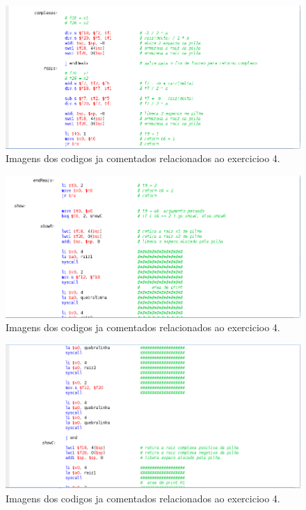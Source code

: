 \documentclass[12pt]{article}
\begin{document}
\begin{figure}[H]
	\centering
	\includegraphics[width=1\textwidth]{EX_4_7.png}
	\caption{Imagens dos codigos ja comentados relacionados ao exercicioo 4.}
	\label{fig:hilo}
\end{figure}

\begin{figure}[H]
	\centering
	\includegraphics[width=1\textwidth]{EX_4_8.png}
	\caption{Imagens dos codigos ja comentados relacionados ao exercicioo 4.}
	\label{fig:hilo}
\end{figure}

\begin{figure}[H]
	\centering
	\includegraphics[width=1\textwidth]{EX_4_9.png}
	\caption{Imagens dos codigos ja comentados relacionados ao exercicioo 4.}
	\label{fig:hilo}
\end{figure}
\end{document}
